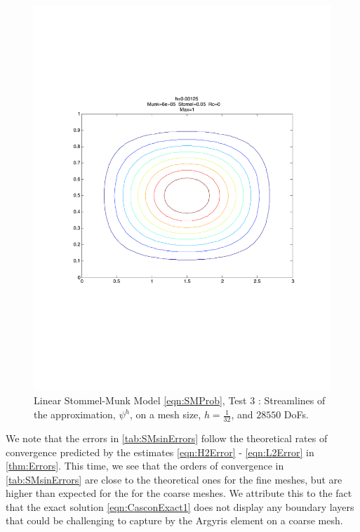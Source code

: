 \begin{figure}%
  \begin{center}
    \includegraphics[scale=0.5]{Figures/StommelMunk1.pdf}
    \caption{Linear Stommel-Munk Model \eqref{eqn:SMProb}, Test 3 \cite{Cascon}: Streamlines of the approximation,
    $\psi^h$, on a mesh size, $h=\frac{1}{32}$, and $28550$ DoFs.}
    \label{fig:StommelMunkSin}
  \end{center}
\end{figure}

We note that the errors in \autoref{tab:SMsinErrors} follow the theoretical
rates of convergence predicted by the estimates \eqref{eqn:H2Error} -
\eqref{eqn:L2Error} in \autoref{thm:Errors}.  This time, we see that the orders
of convergence in \autoref{tab:SMsinErrors} are close to the theoretical ones
for the fine meshes, but are higher than expected for the for the coarse meshes.
We attribute this to the fact that the exact solution \eqref{eqn:CasconExact1}
does not display any boundary layers that could be challenging to capture by the
Argyris element on a coarse mesh.

